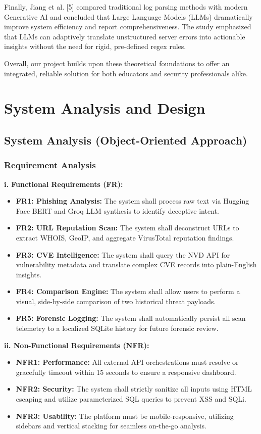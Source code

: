 \documentclass[12pt,a4paper]{report}
\begin{document}
Finally, Jiang et al. [5] compared traditional log parsing methods with modern Generative AI and concluded that Large Language Models (LLMs) dramatically improve system efficiency and report comprehensiveness. The study emphasized that LLMs can adaptively translate unstructured server errors into actionable insights without the need for rigid, pre-defined regex rules.

Overall, our project builds upon these theoretical foundations to offer an integrated, reliable solution for both educators and security professionals alike.

\chapter{System Analysis and Design}

\section{System Analysis (Object-Oriented Approach)}
\subsection{Requirement Analysis}
\textbf{i. Functional Requirements (FR):}
\begin{itemize}
    \item \textbf{FR1: Phishing Analysis:} The system shall process raw text via Hugging Face BERT and Groq LLM synthesis to identify deceptive intent.
    \item \textbf{FR2: URL Reputation Scan:} The system shall deconstruct URLs to extract WHOIS, GeoIP, and aggregate VirusTotal reputation findings.
    \item \textbf{FR3: CVE Intelligence:} The system shall query the NVD API for vulnerability metadata and translate complex CVE records into plain-English insights.
    \item \textbf{FR4: Comparison Engine:} The system shall allow users to perform a visual, side-by-side comparison of two historical threat payloads.
    \item \textbf{FR5: Forensic Logging:} The system shall automatically persist all scan telemetry to a localized SQLite history for future forensic review.
\end{itemize}

\textbf{ii. Non-Functional Requirements (NFR):}
\begin{itemize}
    \item \textbf{NFR1: Performance:} All external API orchestrations must resolve or gracefully timeout within 15 seconds to ensure a responsive dashboard.
    \item \textbf{NFR2: Security:} The system shall strictly sanitize all inputs using HTML escaping and utilize parameterized SQL queries to prevent XSS and SQLi.
    \item \textbf{NFR3: Usability:} The platform must be mobile-responsive, utilizing sidebars and vertical stacking for seamless on-the-go analysis.
\end{itemize}
\end{document}
